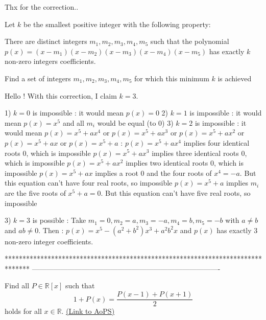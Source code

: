 \begin{solution}
	Thx for the correction..
\end{solution}



\begin{solution}
	\begin{tcolorbox}Let $ k$ be the smallest positive integer with the following property:

There are distinct integers $ m_{1},m_{2},m_{3},m_{4},m_{5}$
such that the polynomial $ p(x)=(x-m_{1})(x-m_{2})(x-m_{3})(x-m_{4})(x-m_{5})$ has exactly $ k$ non-zero integers coefficients.

Find a set of integers $ m_{1},m_{2},m_{3},m_{4},m_{5}$ for which this minimum $ k$ is achieved\end{tcolorbox}

Hello !
With this correction, I claim $ k=3$.

1) $ k=0$ is impossible : it would mean $ p(x)=0$
2) $ k=1$ is impossible : it would mean $ p(x)=x^{5}$ and all $ m_{i}$ would be equal (to 0)
3) $ k=2$ is impossible : it would mean $ p(x)=x^{5}+ax^{4}$ or $ p(x)=x^{5}+ax^{3}$ or $ p(x)=x^{5}+ax^{2}$ or $ p(x)=x^{5}+ax$ or $ p(x)=x^{5}+a$ :
$ p(x)=x^{5}+ax^{4}$ implies four identical roots 0, which is impossible
$ p(x)=x^{5}+ax^{3}$ implies three identical roots 0, which is impossible
$ p(x)=x^{5}+ax^{2}$ implies two identical roots 0, which is impossible
$ p(x)=x^{5}+ax$ implies a root 0 and the four roots of $ x^{4}=-a$. But this equation can't have four real roots, so impossible
$ p(x)=x^{5}+a$ implies $ m_{i}$ are the five roots of $ x^{5}+a=0$. But this equation can't have five real roots, so impossible

3) $ k=3$ is possible :
Take $ m_{1}=0,m_{2}=a,m_{3}=-a,m_{4}=b,m_{5}=-b$ with $ a\neq b$ and $ ab\neq 0$. Then :
$ p(x)=x^{5}-(a^{2}+b^{2})x^{3}+a^{2}b^{2}x$ and $ p(x)$ has exactly 3 non-zero integer coefficients.
\end{solution}
*******************************************************************************
-------------------------------------------------------------------------------

\begin{problem}
	Find all $ P\in\mathbb{R}[x]$ such that \[1+P(x)=\frac{P(x-1)+P(x+1)}{2}\] holds for all $x\in\mathbb R.$
	\flushright \href{https://artofproblemsolving.com/community/c6h159183}{(Link to AoPS)}
\end{problem}



